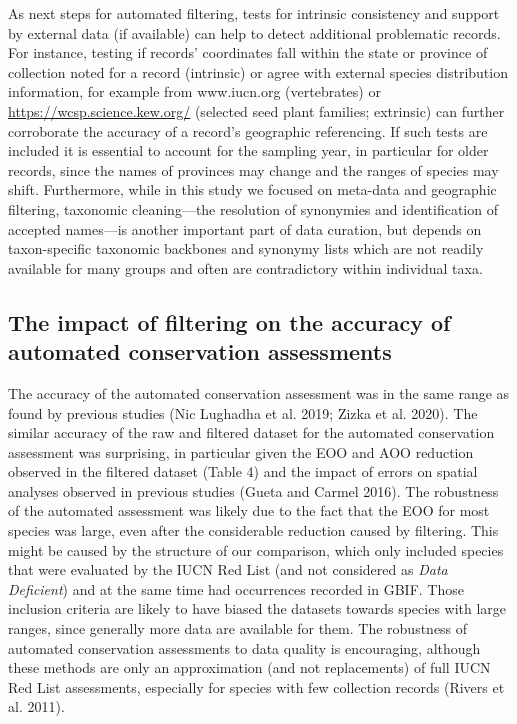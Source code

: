 \documentclass[fleqn,10pt,lineno]{wlpeerj} %
\begin{document}
As next steps for automated filtering, tests for intrinsic consistency and support by external data (if available) can help to detect additional problematic records. For instance, testing if records' coordinates fall within the state or province of collection noted for a record (intrinsic) or agree with external species distribution information, for example from www.iucn.org (vertebrates) or \url{https://wcsp.science.kew.org/} (selected seed plant families; extrinsic) can further corroborate the accuracy of a record's geographic referencing. If such tests are included it is essential to account for the sampling year, in particular for older records, since the names of provinces may change and the ranges of species may shift. Furthermore, while in this study we focused on meta-data and geographic filtering, taxonomic cleaning---the resolution of synonymies and identification of accepted names---is another important part of data curation, but depends on taxon-specific taxonomic backbones and synonymy lists which are not readily available for many groups and often are contradictory within individual taxa.

\hypertarget{the-impact-of-filtering-on-the-accuracy-of-automated-conservation-assessments}{%
\subsection*{The impact of filtering on the accuracy of automated conservation assessments}\label{the-impact-of-filtering-on-the-accuracy-of-automated-conservation-assessments}}

The accuracy of the automated conservation assessment was in the same range as found by previous studies (Nic Lughadha et al. 2019; Zizka et al. 2020). The similar accuracy of the raw and filtered dataset for the automated conservation assessment was surprising, in particular given the EOO and AOO reduction observed in the filtered dataset (Table 4) and the impact of errors on spatial analyses observed in previous studies (Gueta and Carmel 2016). The robustness of the automated assessment was likely due to the fact that the EOO for most species was large, even after the considerable reduction caused by filtering. This might be caused by the structure of our comparison, which only included species that were evaluated by the IUCN Red List (and not considered as \emph{Data Deficient}) and at the same time had occurrences recorded in GBIF. Those inclusion criteria are likely to have biased the datasets towards species with large ranges, since generally more data are available for them. The robustness of automated conservation assessments to data quality is encouraging, although these methods are only an approximation (and not replacements) of full IUCN Red List assessments, especially for species with few collection records (Rivers et al. 2011).
\end{document}
